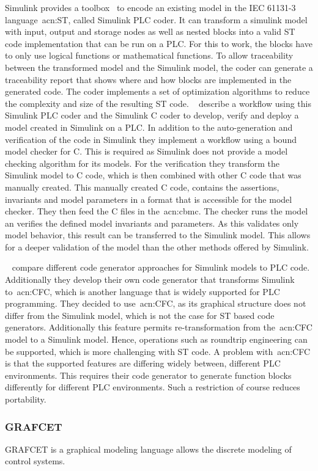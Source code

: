Simulink provides a toolbox~\cite{Simulink:PLC} to encode an existing model in the IEC 61131-3 language~\acrshort{acn:ST}, called Simulink PLC coder.
It can transform a simulink model with input, output and storage nodes as well as nested blocks into a valid ST code implementation that can be run on a PLC.
For this to work, the blocks have to only use logical functions or mathematical functions.
To allow traceability between the transformed model and the Simulink model, the coder can generate a traceability report that shows where and how blocks are implemented in the generated code.
The coder implements a set of optimization algorithms to reduce the complexity and size of the resulting ST code.
\citeauthor{7535242}~\cite{7535242} describe a workflow using this Simulink PLC coder and the Simulink C coder to develop, verify and deploy a model created in Simulink on a PLC.
In addition to the auto-generation and verification of the code in Simulink they implement a workflow using a bound model checker for C.
This is required as Simulink does not provide a model checking algorithm for its models.
For the verification they transform the Simulink model to C code, which is then combined with other C code that was manually created.
This manually created C code, contains the assertions, invariants and model parameters in a format that is accessible for the model checker.
They then feed the C files in the~\acrfull{acn:cbmc}.
The checker runs the model an verifies the defined model invariants and parameters.
As this validates only model behavior, this result can be transferred to the Simulink model.
This allows for a deeper validation of the model than the other methods offered by Simulink.

\citeauthor{6489667}~\cite{6489667} compare different code generator approaches for Simulink models to PLC code.
Additionally they develop their own code generator that transforms Simulink to~\acrfull{acn:CFC}, which is another language that is widely supported for PLC programming.
They decided to use~\acrshort{acn:CFC}, as its graphical structure does not differ from the Simulink model, which is not the case for ST based code generators.
Additionally this feature permits re-transformation from the~\acrshort{acn:CFC} model to a Simulink model.
Hence, operations such as roundtrip engineering can be supported, which is more challenging with ST code.
A problem with~\acrshort{acn:CFC} is that the supported features are differing widely between, different PLC environments.
This requires their code generator to generate function blocks differently for different PLC environments.
Such a restriction of course reduces portability.

\subsubsection{GRAFCET}
\label{sec:sub:grafcet}

GRAFCET is a graphical modeling language allows the discrete modeling of control systems.


\citeauthor{JULIUS20191767}~\cite{JULIUS20191767}
